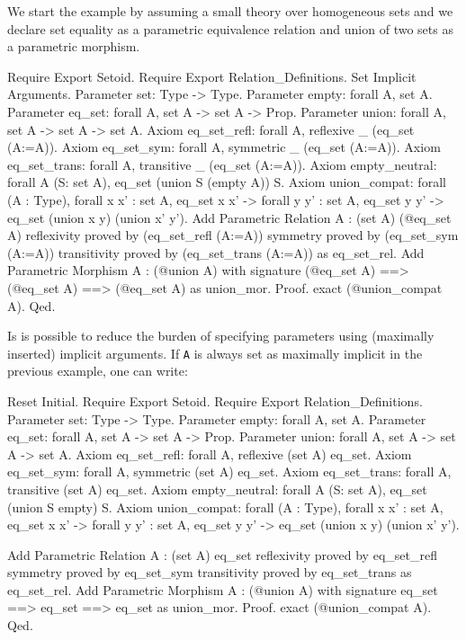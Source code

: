 \begin{cscexample}
We start the example by assuming a small theory over homogeneous sets and
we declare set equality as a parametric equivalence relation and
union of two sets as a parametric morphism.
\begin{coq_example*}
Require Export Setoid.
Require Export Relation_Definitions.
Set Implicit Arguments.
Parameter set: Type -> Type.
Parameter empty: forall A, set A.
Parameter eq_set: forall A, set A -> set A -> Prop.
Parameter union: forall A, set A -> set A -> set A.
Axiom eq_set_refl: forall A, reflexive _ (eq_set (A:=A)).
Axiom eq_set_sym: forall A, symmetric _ (eq_set (A:=A)).
Axiom eq_set_trans: forall A, transitive _ (eq_set (A:=A)).
Axiom empty_neutral: forall A (S: set A), eq_set (union S (empty A)) S.
Axiom union_compat:
 forall (A : Type),
  forall x x' : set A, eq_set x x' ->
  forall y y' : set A, eq_set y y' ->
   eq_set (union x y) (union x' y').
Add Parametric Relation A : (set A) (@eq_set A)
 reflexivity proved by (eq_set_refl (A:=A))
 symmetry proved by (eq_set_sym (A:=A))
 transitivity proved by (eq_set_trans (A:=A))
 as eq_set_rel.
Add Parametric Morphism A : (@union A) with 
signature (@eq_set A) ==> (@eq_set A) ==> (@eq_set A) as union_mor.
Proof. exact (@union_compat A). Qed.
\end{coq_example*}

\end{cscexample}

Is is possible to reduce the burden of specifying parameters using
(maximally inserted) implicit arguments. If \texttt{A} is always set as
maximally implicit in the previous example, one can write:

\begin{coq_eval}
Reset Initial.
Require Export Setoid.
Require Export Relation_Definitions.
Parameter set: Type -> Type.
Parameter empty: forall {A}, set A.
Parameter eq_set: forall {A}, set A -> set A -> Prop.
Parameter union: forall {A}, set A -> set A -> set A.
Axiom eq_set_refl: forall {A}, reflexive (set A) eq_set.
Axiom eq_set_sym: forall {A}, symmetric (set A) eq_set.
Axiom eq_set_trans: forall {A}, transitive (set A) eq_set.
Axiom empty_neutral: forall A (S: set A), eq_set (union S empty) S.
Axiom union_compat:
 forall (A : Type),
  forall x x' : set A, eq_set x x' ->
  forall y y' : set A, eq_set y y' ->
   eq_set (union x y) (union x' y').
\end{coq_eval}

\begin{coq_example*} 
Add Parametric Relation A : (set A) eq_set
 reflexivity proved by eq_set_refl
 symmetry proved by eq_set_sym
 transitivity proved by eq_set_trans
 as eq_set_rel.
Add Parametric Morphism A : (@union A) with
  signature eq_set ==> eq_set ==> eq_set as union_mor.
Proof. exact (@union_compat A). Qed.
\end{coq_example*}

